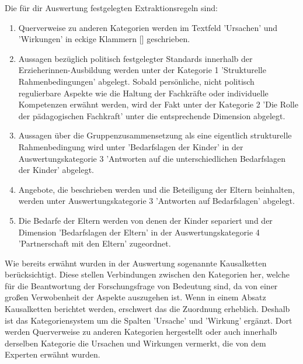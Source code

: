 Die für dir Auswertung festgelegten Extraktionsregeln sind:
\begin{enumerate}
\item Querverweise zu anderen Kategorien werden im Textfeld 'Ursachen' und 'Wirkungen' in eckige Klammern [] geschrieben.
\item Aussagen bezüglich politisch festgelegter Standards innerhalb der Erzieherinnen-Ausbildung werden unter der Kategorie 1 'Strukturelle Rahmenbedingungen' abgelegt. Sobald persönliche, nicht politisch regulierbare Aspekte wie die Haltung der Fachkräfte oder individuelle Kompetenzen erwähnt werden, wird der Fakt unter der Kategorie 2 'Die Rolle der pädagogischen Fachkraft' unter die entsprechende Dimension abgelegt.
\item Aussagen über die Gruppenzusammensetzung als eine eigentlich strukturelle Rahmenbedingung wird unter 'Bedarfslagen der Kinder' in der Auswertungskategorie 3 'Antworten auf die unterschiedlichen Bedarfslagen der Kinder' abgelegt.
\item Angebote, die beschrieben werden und die Beteiligung der Eltern beinhalten, werden unter Auswertungskategorie 3 'Antworten auf Bedarfslagen' abgelegt.
\item Die Bedarfe der Eltern werden von denen der Kinder separiert und  der Dimension 'Bedarfslagen der Eltern' in der Auswertungskategorie 4
'Partnerschaft mit den Eltern' zugeordnet.   
\end{enumerate}

Wie bereits erwähnt wurden in der Auswertung sogenannte Kausalketten berücksichtigt. Diese stellen Verbindungen zwischen den Kategorien her, welche für die Beantwortung der Forschungsfrage von Bedeutung sind, da von einer großen Verwobenheit der Aspekte auszugehen ist. Wenn in einem Absatz Kausalketten berichtet werden, erschwert das die Zuordnung erheblich. Deshalb ist das Kategoriensystem um die Spalten 'Ursache' und 'Wirkung' ergänzt. Dort werden Querverweise zu anderen Kategorien hergestellt oder auch innerhalb derselben Kategorie die Ursachen und Wirkungen vermerkt, die von dem Experten erwähnt wurden.

